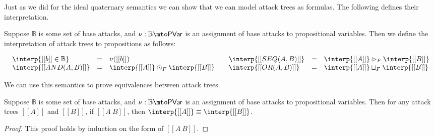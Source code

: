 Just as we did for the ideal quaternary semantics we can show that we
can model attack trees as formulas.  The following defines their
interpretation.
\begin{definition}
  \label{def:interp-aterms-quaternary}
  Suppose $\mathbb{B}$ is some set of base attacks, and $\nu :
  \mathbb{B} \mto \mathsf{PVar}$ is an assignment of base attacks to
  propositional variables.  Then we define the interpretation of
  attack trees to propositions as follows:
  \begin{center}
    \begin{math}
      \setlength{\arraycolsep}{5px}
      \begin{array}{lll}
        \begin{array}{lll}
          \interp{[[b]] \in \mathbb{B}} & = & \nu([[b]])\\
          \interp{[[AND(A, B)]]} & = & \interp{[[A]]} \odot_F \interp{[[B]]}
        \end{array}
        &
        \begin{array}{lll}
          \interp{[[SEQ(A,B)]]} & = & \interp{[[A]]} \rhd_F \interp{[[B]]}\\
          \interp{[[OR(A,B)]]} & = & \interp{[[A]]} \sqcup_F \interp{[[B]]}
        \end{array}
      \end{array}
    \end{math}
  \end{center}
\end{definition}
We can use this semantics to prove equivalences between attack trees.
\begin{lemma}
  \label{lemma:equivalence_of_attack_trees}
  Suppose $\mathbb{B}$ is some set of base attacks, and $\nu :
  \mathbb{B} \mto \mathsf{PVar}$ is an assignment of base attacks to
  propositional variables.  Then for any attack trees $[[A]]$ and
  $[[B]]$, if $[[A ~ B]]$, then $\interp{[[A]]} \equiv
  \interp{[[B]]}$.
\end{lemma}
\begin{proof}
  This proof holds by induction on the form of $[[A ~ B]]$.
\end{proof}
